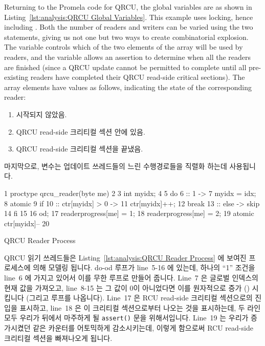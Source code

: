 Returning to the Promela code for QRCU, the global variables are as shown in
Listing~\ref{lst:analysis:QRCU Global Variables}.
This example uses locking, hence including .
Both the number of readers and writers can be varied using the
two  statements, giving us not one but two ways to create
combinatorial explosion.
The  variable controls which of the two elements of the 
array will be used by readers, and the  variable
allows an assertion to determine when all the readers are finished
(since a QRCU update cannot be permitted to complete until all
pre-existing readers have completed their QRCU read-side critical
sections).
The  array elements have values as follows,
indicating the state of the corresponding reader:
\fi

\begin{enumerate}[label={\arabic*}:,start=0,itemsep=0pt]
\item	시작되지 않았음.
\item	QRCU read-side 크리티컬 섹션 안에 있음.
\item	QRCU read-side 크리티컬 섹션을 끝냈음.
\iffalse

\item	not yet started.
\item	within QRCU read-side critical section.
\item	finished with QRCU read-side critical section.
\fi
\end{enumerate}

마지막으로,  변수는 업데이트 쓰레드들의 느린 수행경로들을 직렬화
하는데 사용됩니다.
\iffalse

Finally, the \co{mutex} variable is used to serialize updaters' slowpaths.
\fi

\begin{listing}[htbp]
{ \scriptsize
\begin{verbbox}
  1 proctype qrcu_reader(byte me)
  2 {
  3   int myidx;
  4
  5   do
  6   :: 1 ->
  7     myidx = idx;
  8     atomic {
  9       if
 10       :: ctr[myidx] > 0 ->
 11         ctr[myidx]++;
 12         break
 13       :: else -> skip
 14       fi
 15     }
 16   od;
 17   readerprogress[me] = 1;
 18   readerprogress[me] = 2;
 19   atomic { ctr[myidx]-- }
 20 }
\end{verbbox}
}
\centering
\theverbbox
\caption{QRCU Reader Process}
\label{lst:analysis:QRCU Reader Process}
\end{listing}

QRCU 읽기 쓰레드들은
Listing~\ref{lst:analysis:QRCU Reader Process} 에 보여진 
프로세스에 의해 모델링 됩니다.
do-od 루프가 line~5-16 에 있는데, 하나의 ``1'' 조건을 line~6 에 가지고 있어서
이를 무한 루프로 만들어 줍니다.
Line~7 은 글로벌 인덱스의 현재 값을 가져오고, line~8-15 는 그 값이 0이
아니었다면 이를 원자적으로 증가 () 시킵니다 (그리고
루프를 나옵니다).
Line~17 은 RCU read-side 크리티컬 섹션으로의 진입을 표시하고, line~18 은 이
크리티컬 섹션으로부터 나오는 것을 표시하는데, 두 라인 모두 우리가 뒤에서
마주하게 될 {\tt assert()} 문을 위해서입니다.
Line~19 는 우리가 증가시켰던 같은 카운터를 어토믹하게 감소시키는데, 이렇게
함으로써 RCU read-side 크리티컬 섹션을 빠져나오게 됩니다.
\iffalse


